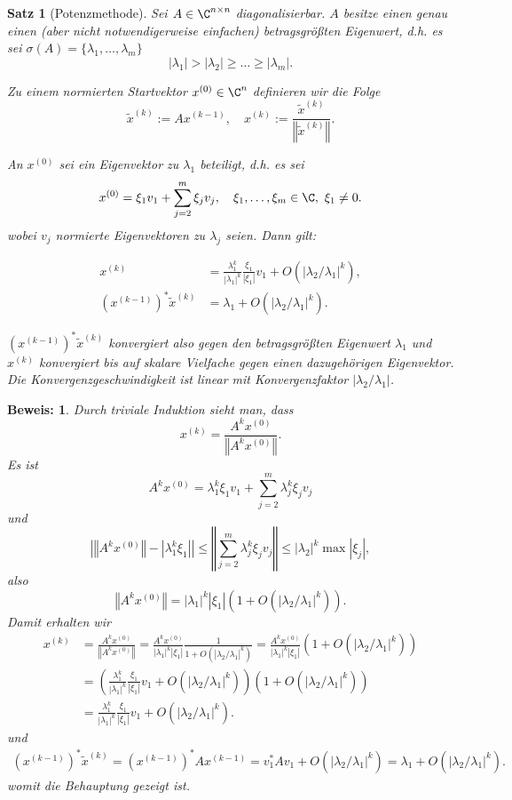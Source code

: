 \documentclass[
]{mycourse}
\theoremstyle{mythm}
\newtheorem{theorem}{Satz}[chapter]
\theoremstyle{break}
\newtheorem*{beweis}{Beweis:}
\newcommand{\norm}[1]{\left\Vert#1\right\Vert}		%
\begin{document}
\begin{theorem}[Potenzmethode]\label{satz:Potenzmethode}
Sei $A\in \C^{n\times n}$ diagonalisierbar. $A$ besitze einen genau einen (aber nicht notwendigerweise einfachen) betragsgrößten Eigenwert, d.h. es sei
$\sigma(A)=\{\lambda_1,\ldots,\lambda_m\}$
\[
|\lambda_1|> |\lambda_2|\geq \ldots \geq |\lambda_m|.
\] 

Zu einem normierten Startvektor $x^{(0)}\in \C^n$ definieren wir die Folge 
\[
\tilde x^{(k)}:=Ax^{(k-1)}, \quad x^{(k)}:=\frac{\tilde x^{(k)}}{\norm{\tilde x^{(k)}}}.
\]

An $x^{(0)}$ sei ein Eigenvektor zu $\lambda_1$ beteiligt, d.h. 
es sei 
\[
x^{(0)}=\xi_1 v_1 + \sum_{j=2}^m \xi_j v_j, \quad \xi_1,\ldots,\xi_m\in \C,\ \xi_1\neq 0.
\]
wobei $v_j$ normierte Eigenvektoren zu $\lambda_j$ seien. Dann gilt:

\begin{align*}
x^{(k)}&= \frac{\lambda_1^k}{|\lambda_1|^k} \frac{\xi_1}{|\xi_1|} v_1 + O(\left| \lambda_2 / \lambda_1\right|^k),\\
(x^{(k-1)})^* \tilde x^{(k)} &= \lambda_1 + O(\left| \lambda_2 / \lambda_1\right|^{k}).
\end{align*}

$(x^{(k-1)})^* \tilde x^{(k)}$ konvergiert also gegen den betragsgrößten Eigenwert $\lambda_1$ und $x^{(k)}$ konvergiert bis auf skalare Vielfache gegen einen dazugehörigen Eigenvektor. Die Konvergenzgeschwindigkeit ist linear mit Konvergenzfaktor $|\lambda_2 / \lambda_1|$.
\end{theorem}
\begin{beweis}
Durch triviale Induktion sieht man, dass
\[
x^{(k)}=\frac{A^{k}x^{(0)}}{\norm{A^{k}x^{(0)}}}.
\]
Es ist 
\[
A^{k}x^{(0)}=\lambda_1^k \xi_1 v_1 + \sum_{j=2}^m \lambda_j^k \xi_j v_j
\]
und 
\[
\left| \norm{A^{k}x^{(0)}}- |\lambda_1^k \xi_1| \right| \leq \norm{\sum_{j=2}^m \lambda_j^k \xi_j v_j}
\leq |\lambda_2|^k \max |\xi_j|,
\]
also 
\[
\norm{A^{k}x^{(0)}}=|\lambda_1|^k |\xi_1| \left( 1 + O(\left| \lambda_2 / \lambda_1\right|^k ) \right).
\]
Damit erhalten wir
\begin{align*}
x^{(k)}&=\frac{A^{k}x^{(0)}}{\norm{A^{k}x^{(0)}}}=\frac{A^{k}x^{(0)}}{|\lambda_1|^k |\xi_1|} \frac{1}{1 + O(\left| \lambda_2 / \lambda_1\right|^k )}
=\frac{A^{k}x^{(0)}}{|\lambda_1|^k |\xi_1|} \left( 1 + O(\left| \lambda_2 / \lambda_1\right|^k )\right)\\
&= \left( \frac{\lambda_1^k}{|\lambda_1|^k} \frac{\xi_1}{|\xi_1|} v_1 + O(\left| \lambda_2 / \lambda_1\right|^k ) \right)
 \left( 1 + O(\left| \lambda_2 / \lambda_1\right|^k )\right)\\
&=\frac{\lambda_1^k}{|\lambda_1|^k} \frac{\xi_1}{|\xi_1|} v_1 + O(\left| \lambda_2 / \lambda_1\right|^k).
\end{align*}
und %
\begin{align*}
(x^{(k-1)})^* \tilde x^{(k)}= (x^{(k-1)})^* A x^{(k-1)} = v_1^* A v_1 + O(\left| \lambda_2 / \lambda_1\right|^{k})
= \lambda_1 + O(\left| \lambda_2 / \lambda_1\right|^{k}).
\end{align*}
womit die Behauptung gezeigt ist.
\end{beweis}
\end{document}
